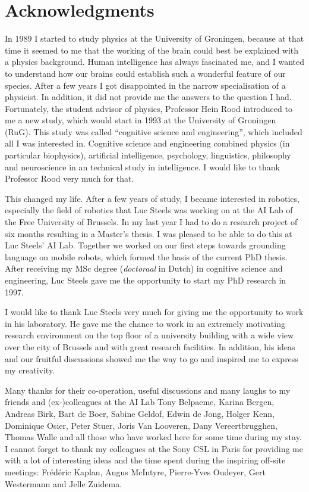 \chapter*{Acknowledgments}

In 1989 I started to study physics at the University of Groningen, because at that time it seemed to me that the working of the brain could best be explained with a physics background. Human intelligence has always fascinated me, and I wanted to understand how our brains could establish such a wonderful feature of our species. After a few years I got disappointed in the narrow specialisation of a physicist. In addition, it did not provide me the answers to the question I had. Fortunately, the student advisor of physics, Professor Hein Rood introduced to me a new study, which would start in 1993 at the University of Groningen (RuG). This study was called ``cognitive science and engineering'', which included all I was interested in. Cognitive science and engineering combined physics (in particular biophysics), artificial intelligence, psychology, linguistics, philosophy and neuroscience in an technical study in intelligence. I would like to thank Professor Rood very much for that.

This changed my life. After a few years of study, I became interested in robotics, especially the field of robotics that Luc Steels was working on at the AI Lab of the Free University of Brussels. In my last year I had to do a research project of six months resulting in a Master's thesis. I was pleased to be able to do this at Luc Steels' AI Lab. Together we worked on our first steps towards grounding language on mobile robots, which formed the basis of the current PhD thesis. After receiving my MSc degree (\textit{doctoraal} in Dutch) in cognitive science and engineering, Luc Steels gave me the opportunity to start my PhD research in 1997.

I would like to thank Luc Steels very much for giving me the opportunity to work in his laboratory. He gave me the chance to work in an extremely motivating research environment on the top floor of a university building with a wide view over the city of Brussels and with great research facilities. In addition, his ideas and our fruitful discussions showed me the way to go and inspired me to express my creativity.

Many thanks for their co-operation, useful discussions and many laughs to my friends and (ex-)colleagues at the AI Lab Tony Belpaeme, Karina Bergen, Andreas Birk, Bart de Boer, Sabine Geldof, Edwin de Jong, Holger Kenn, Dominique Osier, Peter Stuer, Joris Van Looveren, Dany Vereertbrugghen, Thomas Walle and all those who have worked here for some time during my stay. I cannot forget to thank my colleagues at the Sony CSL in Paris for providing me with a lot of interesting ideas and the time spent during the inspiring off-site meetings: Fr\'ed\'eric Kaplan, Angus McIntyre, Pierre-Yves Oudeyer, Gert Westermann and Jelle Zuidema.

